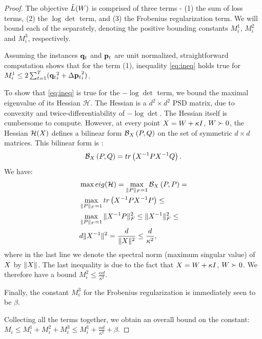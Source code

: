 \documentclass{article}
\begin{document}
\begin{proof}

The objective $\tilde{L}({W})$ is comprised of three terms - (1) the sum of loss terms, (2) the $\log \det$ term, and (3) the Frobenius regularization term. We will bound each of the separately, denoting the positive bounding constants $M^1_i$, $M^2_i$ and $M^3_i$, respectively.  

Assuming the instances ${{\mathbf{q}}_{{t}}}$ and ${{\mathbf{p}}_{{t}}}$ are unit normalized, straightforward computation shows that for the term (1), inequality \ref{eq:ineq} holds true for $M^1_i \leq 2 \sum_{t=1}^T ({{\mathbf{q}}_{{t}}}_i^2 +{\Delta\mathbf{p}_{t}}_i^2)$. %

To show that \ref{eq:ineq} is true for the $- \log \det$ term, we bound the maximal eigenvalue of its Hessian $\mathcal{H}$. 
The Hessian is a $d^2 \times d^2$ PSD matrix, due to convexity and twice-differentiability of $- \log \det$. The Hessian itself is cumbersome to compute.
However, at every point ${X} = {W} + \kappa I$, ${W} \succ 0$, the Hessian $\mathcal{H}({X})$ defines a bilinear form $\mathcal{B}_{{X}}\left({P},{Q}\right)$ on the set of symmetric $d \times d$ matrices. This bilinear form is \citep[Appendix A.4.3]{boyd2004convex}: $$\mathcal{B}_{{X}}\left({P},{Q}\right) = tr\left({X}^{-1}{P} {X}^{-1}{Q}\right).$$  We have:
\begin{align*}
&\max eig(\mathcal{H}) = \max_{\|{P}\|_F=1} \mathcal{B}_{{X}}\left({P},{P}\right) = \\
&\max_{\|{P}\|_F=1} tr\left({X}^{-1}{P} {X}^{-1}{P}\right) \leq \\
&\max_{\|{P}\|_F=1} \|{X}^{-1} {P}\|_F^2 \leq \|{X}^{-1}\|_F^2 \leq  \\
& d \|{X}^{-1}\|^2 = \frac{d}{\|{X}\|^2} \leq \frac{d}{\kappa^2},
\end{align*}
where in the last line we denote the spectral norm (maximum singular value) of ${X}$ by $\|{X}\|$. The last inequality is due to the fact that ${X} = {W} + \kappa I$, ${W} \succ 0$.
We therefore have a bound $M^2_i \leq \frac{\alpha d}{\kappa^2}$.

Finally, the constant $M^3_{i}$ for the Frobenius regularization is immediately seen to be $\beta$.

Collecting all the terms together, we obtain an overall bound on the constant: $M_i \leq M^1_{i} + M^2_{i} + M^3_{i} \leq  M^1_{i} + \frac{\alpha d}{\kappa ^2} + \beta$.

\end{proof}
\end{document}
